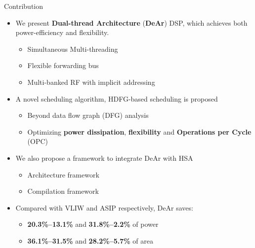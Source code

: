 \documentclass{beamer}
\begin{document}
\begin{CJK}{UTF8}{bkai}
    \begin{frame}{Contribution}
        \begin{itemize}
            \item <2->{
                    We present \textbf{Dual-thread Architecture} (\textbf{DeAr}) DSP, which achieves both power-efficiency and flexibility.
                    \begin{itemize}
                        \item {
                                Simultaneous Multi-threading 
                            }
                        \item {
                                Flexible forwarding bus
                            }
                        \item {
                                Multi-banked RF with implicit addressing
                            }
                    \end{itemize}
                }
            \item <3->{
                    A novel scheduling algorithm, HDFG-based scheduling is proposed
                    \begin{itemize}
                        \item Beyond data flow graph (DFG) analysis
                        \item Optimizing \textbf{power dissipation}, \textbf{flexibility} and \textbf{Operations per Cycle} (OPC)
                    \end{itemize}
                }
            \item <4->{
                    We also propose a framework to integrate DeAr with HSA
                    \begin{itemize}
                        \item {
                                Architecture framework
                            }
                        \item {
                                Compilation framework
                            }
                    \end{itemize}
                }
            \item <5->{
                    Compared with VLIW and ASIP respectively, DeAr saves: 
                    \begin{itemize}
                        \item {
                                \textbf{20.3\%--13.1\%} and \textbf{31.8\%--2.2\%} of power
                                }
                            \item {
                                    \textbf{36.1\%--31.5\%} and \textbf{28.2\%--5.7\%} of area
                                    }
                            \end{itemize}
                        }
                \end{itemize}
            \end{frame}


\end{CJK}
\end{document}
